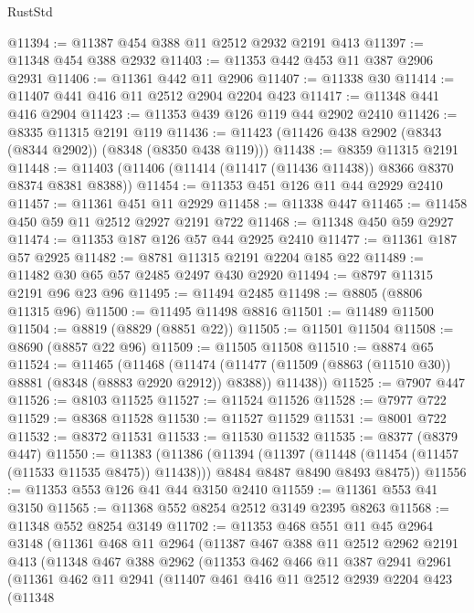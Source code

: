 \begin{lexlean}{RustStd}
\begin{coremodule}
@11394 := @11387 @454 @388 @11 @2512 @2932 @2191 @413
@11397 := @11348 @454 @388 @2932
@11403 := @11353 @442 @453 @11 @387 @2906 @2931
@11406 := @11361 @442 @11 @2906
@11407 := @11338 @30
@11414 := @11407 @441 @416 @11 @2512 @2904 @2204 @423
@11417 := @11348 @441 @416 @2904
@11423 := @11353 @439 @126 @119 @44 @2902 @2410
@11426 := @8335 @11315 @2191 @119
@11436 := @11423 (@11426 @438 @2902 (@8343 (@8344 @2902)) (@8348 (@8350 @438 @119)))
@11438 := @8359 @11315 @2191
@11448 := @11403 (@11406 (@11414 (@11417 (@11436 @11438)) @8366 @8370 @8374 @8381 @8388))
@11454 := @11353 @451 @126 @11 @44 @2929 @2410
@11457 := @11361 @451 @11 @2929
@11458 := @11338 @447
@11465 := @11458 @450 @59 @11 @2512 @2927 @2191 @722
@11468 := @11348 @450 @59 @2927
@11474 := @11353 @187 @126 @57 @44 @2925 @2410
@11477 := @11361 @187 @57 @2925
@11482 := @8781 @11315 @2191 @2204 @185 @22
@11489 := @11482 @30 @65 @57 @2485 @2497 @430 @2920
@11494 := @8797 @11315 @2191 @96 @23 @96
@11495 := @11494 @2485
@11498 := @8805 (@8806 @11315 @96)
@11500 := @11495 @11498 @8816
@11501 := @11489 @11500
@11504 := @8819 (@8829 (@8851 @22))
@11505 := @11501 @11504
@11508 := @8690 (@8857 @22 @96)
@11509 := @11505 @11508
@11510 := @8874 @65
@11524 := @11465
    (@11468
      (@11474
        (@11477 (@11509 (@8863 (@11510 @30)) @8881 (@8348 (@8883 @2920 @2912)) @8388))
        @11438))
@11525 := @7907 @447
@11526 := @8103 @11525
@11527 := @11524 @11526
@11528 := @7977 @722
@11529 := @8368 @11528
@11530 := @11527 @11529
@11531 := @8001 @722
@11532 := @8372 @11531
@11533 := @11530 @11532
@11535 := @8377 (@8379 @447)
@11550 := @11383
    (@11386
      (@11394
        (@11397 (@11448 (@11454 (@11457 (@11533 @11535 @8475)) @11438)))
        @8484
        @8487
        @8490
        @8493
        @8475))
@11556 := @11353 @553 @126 @41 @44 @3150 @2410
@11559 := @11361 @553 @41 @3150
@11565 := @11368 @552 @8254 @2512 @3149 @2395 @8263
@11568 := @11348 @552 @8254 @3149
@11702 := @11353
    @468
    @551
    @11
    @45
    @2964
    @3148
    (@11361
      @468
      @11
      @2964
      (@11387
        @467
        @388
        @11
        @2512
        @2962
        @2191
        @413
        (@11348
          @467
          @388
          @2962
          (@11353
            @462
            @466
            @11
            @387
            @2941
            @2961
            (@11361
              @462
              @11
              @2941
              (@11407
                @461
                @416
                @11
                @2512
                @2939
                @2204
                @423
                (@11348

\end{coremodule}
\end{lexlean}
